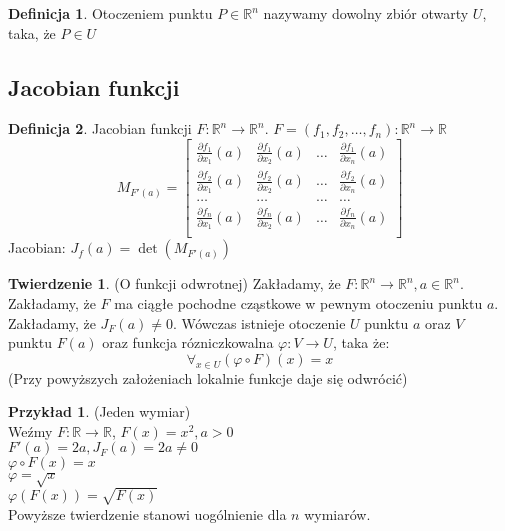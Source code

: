 \documentclass{article}
\theoremstyle{definition}
\newtheorem{de}{Definicja}[subsection]
\theoremstyle{definition}
\newtheorem{tw}{Twierdzenie}[subsection]
\theoremstyle{definition}
\newtheorem{pk}{Przykład}[subsection]
\theoremstyle{definition}
\theoremstyle{definition}
\theoremstyle{definition}
\theoremstyle{definition}
\begin{document}
\begin{de}
    Otoczeniem punktu $P\in\mathbb{R}^n$ nazywamy dowolny zbiór otwarty $U$, taka, że $P\in U$
\end{de}

\subsection{Jacobian funkcji}

\begin{de}
    Jacobian funkcji $F: \mathbb{R}^n \rightarrow \mathbb{R}^n$. $F=(f_1,f_2,\dots,f_n): \mathbb{R}^n\rightarrow\mathbb{R}$
    \[M_{F'(a)} = \begin{bmatrix}
        \frac{\partial f_1}{\partial x_1} (a) & \frac{\partial f_1}{\partial x_2} (a) & \dots & \frac{\partial f_1}{\partial x_n} (a) \\
        \frac{\partial f_2}{\partial x_1} (a) & \frac{\partial f_2}{\partial x_2} (a) & \dots & \frac{\partial f_2}{\partial x_n} (a) \\
        \dots & \dots & \dots & \dots \\
        \frac{\partial f_n}{\partial x_1} (a) & \frac{\partial f_n}{\partial x_2} (a) & \dots & \frac{\partial f_n}{\partial x_n} (a) \\
        \end{bmatrix}\]
    Jacobian: $J_f (a) = \det (M_{F'(a)})$
\end{de}

\begin{tw}
    (O funkcji odwrotnej)
    Zakładamy, że $F: \mathbb{R}^n\rightarrow \mathbb{R}^n, a\in \mathbb{R}^n$.
    Zakładamy, że $F$ ma ciągłe pochodne cząstkowe w pewnym otoczeniu punktu $a$.
    Zakładamy, że $J_{F}(a)\neq 0$.
    Wówczas istnieje otoczenie $U$ punktu $a$ oraz $V$ punktu $F(a)$ oraz funkcja rózniczkowalna $\varphi: V\rightarrow U$, taka że:
    \[\forall_{x\in U} (\varphi \circ F) (x) = x\]
    (Przy powyższych założeniach lokalnie funkcje daje się odwrócić)
\end{tw}

\begin{pk}
    (Jeden wymiar) \\
    Weźmy $F:\mathbb{R} \rightarrow \mathbb{R}$, $F(x)=x^2, a>0$\\
    $F'(a) = 2a, J_F(a)=2a\neq 0$\\
    $\varphi \circ F(x) = x$\\
    $\varphi = \sqrt{x}$\\
    $\varphi\left(F(x)\right)=\sqrt{F(x)}$\\
    Powyższe twierdzenie stanowi uogólnienie dla $n$ wymiarów.
\end{pk}
\end{document}
